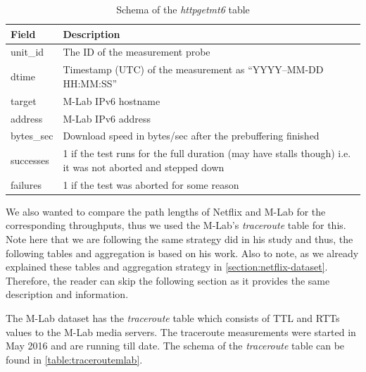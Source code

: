 \begin{table}[!h]
	\centering
	\caption{Schema of the \textit{httpgetmt6} table}
	\label{table:mlabv6}
	\begin{tabular}{lp{10cm}}
  		\toprule
  		\textbf{Field} & \textbf{Description} \\ 
  		\midrule
  		unit\_id & The ID of the measurement probe \\ 
  		dtime & Timestamp (UTC) of the measurement as “YYYY–MM-DD HH:MM:SS” \\ 
		target & M-Lab IPv6 hostname \\ 
		address &  M-Lab IPv6 address \\ 
		bytes\_sec  & Download speed in bytes/sec after the prebuffering finished \\  
		successes  & 1 if the test runs for the full duration (may have stalls though) i.e. it was not aborted and stepped down \\ 
		failures  & 1 if the test was aborted for some reason \\
  		\bottomrule
\end{tabular}
\end{table}

\FloatBarrier

We also wanted to compare the path lengths of Netflix and M-Lab for the corresponding throughputs, thus we used the M-Lab's \textit{traceroute} table for this. Note here that we are following the same strategy \cite{viet} did in his study and thus, the following tables and aggregation is based on his work. Also to note, as we already explained these tables and aggregation strategy in \cref{section:netflix-dataset}. Therefore, the reader can skip the following section as it provides the same description and information. 

The M-Lab dataset has the \textit{traceroute} table which consists of TTL and RTTs values to the M-Lab media servers. The traceroute measurements were started in May 2016 and are running till date. The schema of the \textit{traceroute} table can be found in \cref{table:traceroutemlab}.

